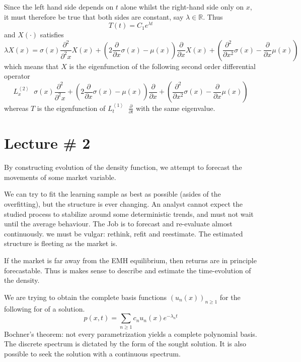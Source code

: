 \documentclass[a4paper]{article}
\newcommand{\brac}[1]{{\left ( #1 \right )}}
\newcommand{\brkt}[1]{{\left\langle #1 \right\rangle}}
\newcommand{\Real}{\mathbb{R}}
\newcommand{\defn}{\mathop{\overset{\Delta}{=}}\nolimits}
\begin{document}
Since the left hand side depends on $t$ alone whilst the right-hand side only on $x$,
it must therefore be true that both sides are constant, say $\lambda\in \Real$. Thus
\[ T(t) = C_1 e^{\lambda t} \] and $X(\cdot)$ satisfies
\[\lambda X(x) = \sigma(x) \frac{\partial^2}{\partial^2 x} X(x) + \brac{ 2 \frac{\partial}{\partial x} \sigma(x) - \mu(x) } \frac{\partial}{\partial x} X(x) + \brac{ \frac{\partial^2}{\partial x^2} \sigma(x) - \frac{\partial}{\partial x} \mu(x) }\]
which means that $X$ is the eigenfunction of the following second order differential operator
\[L^\brkt{2}_x \defn \sigma(x) \frac{\partial^2}{\partial^2 x} + \brac{ 2 \frac{\partial}{\partial x} \sigma(x) - \mu(x) } \frac{\partial}{\partial x} + \brac{ \frac{\partial^2}{\partial x^2} \sigma(x) - \frac{\partial}{\partial x} \mu(x) } \]
whereas $T$ is the eigenfunction of $L^\brkt{1}_t \defn \frac{\partial}{\partial t}$ with the same eigenvalue.


\section{Lecture \# 2} %
\label{sec:lecture_2}

By constructing evolution of the density function, we attempt to forecast the movements of some market variable.

We can try to fit the learning sample as best as possible (asides of the overfitting), but the structure is ever changing.
An analyst cannot expect the studied process to stabilize around some deterministic trends, and must not wait until the average behaviour.
The Job is to forecast and re-evaluate almost continuously. we must be vulgar: rethink, refit and reestimate.
The estimated structure is fleeting as the market is.  

If the market is far away from the EMH equilibrium, then returns are in principle forecastable.
Thus is makes sense to describe and estimate the time-evolution of the density.

We are trying to obtain the complete basis functions $\brac{u_n(x)}_{n\geq 1}$ for the following for of a solution.
\[p(x,t) = \sum_{n\geq 1} c_n u_n(x) e^{-\lambda_n t}\]
Bochner's theorem: not every parametrization yields a complete polynomial basis.
The discrete spectrum is dictated by the form of the sought solution.
It is also possible to seek the solution with a continuous spectrum.

\end{document}
